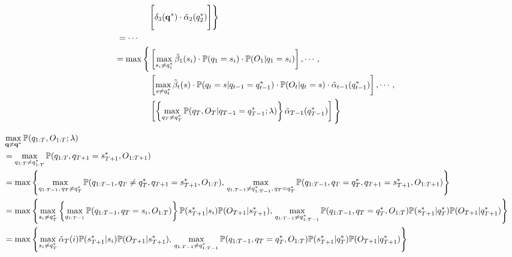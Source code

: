 \begin{equation*}
\begin{split}
               & \Bigg[ \delta_3(\mathbf{q}^*) \cdot \tilde{\alpha}_2(q_2^*) \Bigg] \Bigg\} \\
= \cdots \hspace{14pt} & \\
= \max \Bigg\{ & \left[ \max_{s_i \ne q_1^*} \tilde{\beta}_1(s_i) \cdot \mathbb{P}(q_1 = s_i) \cdot \mathbb{P}(O_1 |q_1 = s_i) \right], 
                 \cdots, \\
               & \left[ \max_{s \ne q_t^*} \tilde{\beta}_t(s) \cdot \mathbb{P}(q_t=s |q_{t-1} = q_{t-1}^*) \cdot \mathbb{P}(O_t |q_t=s) \cdot \tilde{\alpha}_{t-1}(q_{t-1}^*) \right], 
                 \cdots, \\
               & \left[ \left\{ \max_{q_T \ne q_{T}^*} \mathbb{P}(q_T, O_T |q_{T-1} = q_{T-1}^*; \lambda) \right\} \tilde{\alpha}_{T-1}(q_{T-1}^*) \right] \Bigg\}
\end{split}
\end{equation*}



\begin{align*}
&\max_{\mathbf{q} \ne \mathbf{q}^*} \mathbb{P}(q_{1:T}, O_{1:T}; \lambda) \\
&= \max_{q_{1:T} \ne q_{1:T}^*} \mathbb{P}(q_{1:T}, q_{T+1} = s_{T+1}^*, O_{1:T+1}) \\
&= \max \left\{
    \max_{q_{1:T-1}, \, q_T \ne q_T^*} \mathbb{P}(q_{1:T-1}, q_T \ne q_T^*, q_{T+1} = s_{T+1}^*, O_{1:T}), \,
    \max_{q_{1:T-1} \ne q_{1:T-1}^*, \, q_T = q_T^*} \mathbb{P}(q_{1:T-1}, q_T = q_T^*, q_{T+1} = s_{T+1}^*, O_{1:T+1}) 
   \right\} \\
&= \max \left\{
   \max_{s_i \ne q_T^*} \left\{ \max_{q_{1:T-1}} \mathbb{P}(q_{1:T-1}, q_T = s_i, O_{1:T}) \right\} 
        \mathbb{P}(s_{T+1}^* |s_i) \mathbb{P}(O_{T+1} | s_{T+1}^*), \,
   \max_{q_{1:T-1} \ne q_{1:T-1}^*} \mathbb{P}(q_{1:T-1}, q_T = q_T^*, O_{1:T}) \mathbb{P}(s_{T+1}^* |q_{T}^*) \mathbb{P}(O_{T+1} |q_{T+1}^*)
   \right\} \\
&= \max \left\{
   \max_{s_i \ne q_T^*} \tilde{\alpha}_{T}(i)
        \mathbb{P}(s_{T+1}^* |s_i) \mathbb{P}(O_{T+1} | s_{T+1}^*), \,
   \max_{q_{1:T-1} \ne q_{1:T-1}^*} \mathbb{P}(q_{1:T-1}, q_T = q_T^*, O_{1:T}) \mathbb{P}(s_{T+1}^* |q_{T}^*) \mathbb{P}(O_{T+1} |q_{T+1}^*)
   \right\} 
\end{align*}

